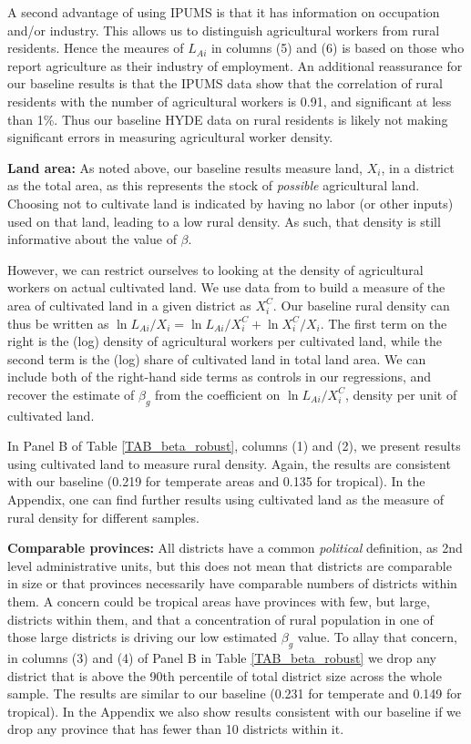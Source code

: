 \documentclass[11pt]{article}
\begin{document}
A second advantage of using IPUMS is that it has information on occupation and/or industry. This allows us to distinguish agricultural workers from rural residents. Hence the meaures of $L_{Ai}$ in columns (5) and (6) is based on those who report agriculture as their industry of employment. An additional reassurance for our baseline results is that the IPUMS data show that the correlation of rural residents with the number of agricultural workers is 0.91, and significant at less than 1\%. Thus our baseline HYDE data on rural residents is likely not making significant errors in measuring agricultural worker density.

\textbf{Land area:} As noted above, our baseline results measure land, $X_i$, in a district as the total area, as this represents the stock of \textit{possible} agricultural land. Choosing not to cultivate land is indicated by having no labor (or other inputs) used on that land, leading to a low rural density. As such, that density is still informative about the value of $\beta$.

However, we can restrict ourselves to looking at the density of agricultural workers on actual cultivated land. We use data from \cite{gaez} to build a measure of the area of cultivated land in a given district as $X^C_i$. Our baseline rural density can thus be written as $\ln L_{Ai}/X_i = \ln L_{Ai}/X_i^C + \ln X_i^C/X_i$. The first term on the right is the (log) density of agricultural workers per cultivated land, while the second term is the (log) share of cultivated land in total land area. We can include both of the right-hand side terms as controls in our regressions, and recover the estimate of $\beta_g$ from the coefficient on $\ln L_{Ai}/X_i^C$, density per unit of cultivated land.

In Panel B of Table \ref{TAB_beta_robust}, columns (1) and (2), we present results using cultivated land to measure rural density. Again, the results are consistent with our baseline (0.219 for temperate areas and 0.135 for tropical). In the Appendix, one can find further results using cultivated land as the measure of rural density for different samples.

\vspace{.5cm}\noindent\textbf{Comparable provinces:} All districts have a common \textit{political} definition, as 2nd level administrative units, but this does not mean that districts are comparable in size or that provinces necessarily have comparable numbers of districts within them. A concern could be tropical areas have provinces with few, but large, districts within them, and that a concentration of rural population in one of those large districts is driving our low estimated $\beta_g$ value. To allay that concern, in columns (3) and (4) of Panel B in Table \ref{TAB_beta_robust} we drop any district that is above the 90th percentile of total district size across the whole sample. The results are similar to our baseline (0.231 for temperate and 0.149 for tropical). In the Appendix we also show results consistent with our baseline if we drop any province that has fewer than 10 districts within it. 
\end{document}
